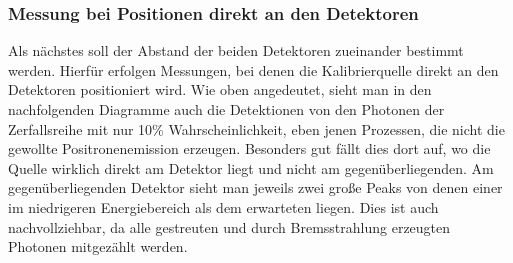     \subsubsection{Messung bei Positionen direkt an den Detektoren}
        Als nächstes soll der Abstand der beiden Detektoren zueinander bestimmt werden. Hierfür erfolgen Messungen, bei denen die Kalibrierquelle direkt an den Detektoren positioniert wird.
        Wie oben angedeutet, sieht man in den nachfolgenden Diagramme auch die Detektionen von den Photonen der Zerfallsreihe mit nur 10\% Wahrscheinlichkeit, eben jenen Prozessen, die nicht
        die gewollte Positronenemission erzeugen. Besonders gut fällt dies dort auf, wo die Quelle wirklich direkt am Detektor liegt und nicht am gegenüberliegenden.
        Am gegenüberliegenden Detektor sieht man jeweils zwei große Peaks von denen einer im niedrigeren Energiebereich als dem erwarteten liegen.
        Dies ist auch nachvollziehbar, da alle gestreuten und durch Bremsstrahlung erzeugten Photonen mitgezählt werden.
